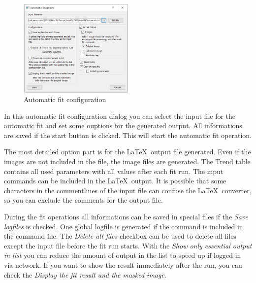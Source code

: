 \documentclass[11pt]{article} %
\begin{document}
\begin{figure}
  \begin{center}
    \includegraphics[width=0.5\textwidth]{gui-fit-auto.png}
  \end{center}
  \caption{Automatic fit configuration}
\end{figure}
In this automatic fit configuration dialog you can select the input file for the automatic fit and set some ouptions for the generated output. All informations are saved if the start button is clicked. This will start the automatic fit operation.

The most detailed option part is for the \LaTeX\  output file generated. Even if the images are not included in the file, the image files are generated. The Trend table contains all used parameters with all values after each fit run. The input commands can be included in the \LaTeX\  output. It is possible that some characters in the commentlines of the input file can confuse the \LaTeX\ converter, so you can exclude the comments for the output file.

During the fit operations all informations can be saved in special files if the {\it Save logfiles} is checked. One global logfile is generated if the command is included in the command file. The {\it Delete all files} checkbox can be used to delete all files except the input file before the fit run starts. With the {\it Show only essential output in list} you can reduce the amount of output in the list to speed up if logged in via network. If you want to show the result immediately after the run, you can check the {\it Display the fit result and the masked image}.


\clearpage
\end{document}

